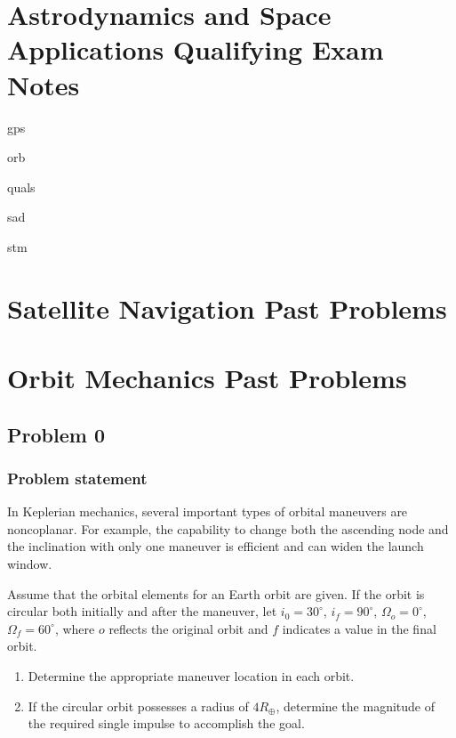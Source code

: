 \documentclass[
]{article}
\author{}
\date{}
\let\oldsection\section
\renewcommand\section{\clearpage\oldsection}
\providecommand{\tightlist}{%
  \setlength{\itemsep}{0pt}\setlength{\parskip}{0pt}}
\begin{document}
\section{Astrodynamics and Space Applications Qualifying Exam
Notes}\label{astrodynamics-and-space-applications-qualifying-exam-notes}

gps

orb

quals

sad

stm

\section{Satellite Navigation Past
Problems}\label{satellite-navigation-past-problems}

\section{Orbit Mechanics Past
Problems}\label{orbit-mechanics-past-problems}

\subsection{Problem 0}\label{problem-0}

\subsubsection{Problem statement}\label{problem-statement}

In Keplerian mechanics, several important types of orbital maneuvers are
noncoplanar. For example, the capability to change both the ascending
node and the inclination with only one maneuver is efficient and can
widen the launch window.

Assume that the orbital elements for an Earth orbit are given. If the
orbit is circular both initially and after the maneuver, let
\(i_0=30^\circ\), \(i_f=90^\circ\), \(\Omega_o=0^\circ\),
\(\Omega_f=60^\circ\), where \(o\) reflects the original orbit and \(f\)
indicates a value in the final orbit.

\begin{enumerate}
\tightlist
\item
  Determine the appropriate maneuver location in each orbit.
\item
  If the circular orbit possesses a radius of \(4R_\oplus\), determine
  the magnitude of the required single impulse to accomplish the goal.
\end{enumerate}
\end{document}
